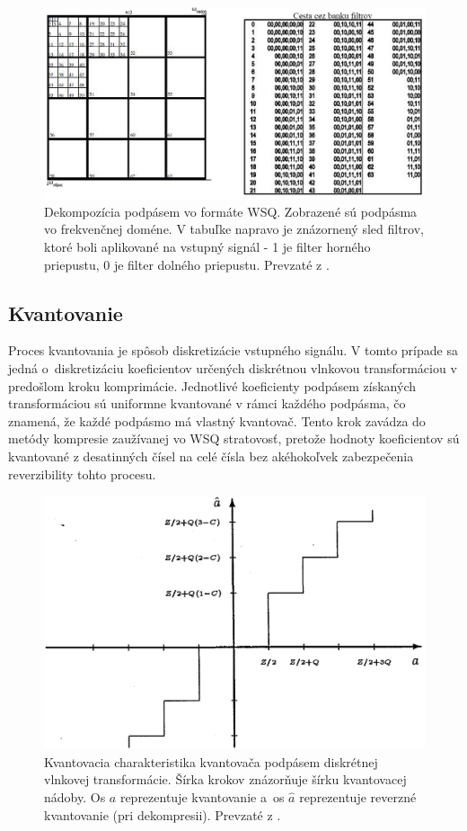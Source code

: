   \begin{figure}[h]
    \centering
    \includegraphics[width=\linewidth]{obrazky-figures/WSQ_DWT_subband_decomposition.png}
    \caption{Dekompozícia podpásem vo formáte WSQ. Zobrazené sú podpásma vo frekvenčnej doméne. V tabuľke napravo je znázornený sled filtrov, ktoré boli
    aplikované na vstupný signál - 1 je filter horného priepustu, 0 je filter dolného priepustu. Prevzaté z \cite{WSQSpecification}.}
    \label{obr:WSQ_DWT_dekompozicia}
  \end{figure}

  \subsection{Kvantovanie}
  Proces kvantovania je spôsob diskretizácie vstupného signálu. V tomto prípade sa jedná o~diskretizáciu koeficientov určených diskrétnou vlnkovou
  transformáciou v predošlom kroku komprimácie. Jednotlivé koeficienty podpásem získaných transformáciou sú uniformne kvantované v rámci každého podpásma,
  čo znamená, že každé podpásmo má vlastný kvantovač. Tento krok zavádza do metódy kompresie zaužívanej vo WSQ stratovosť, pretože hodnoty koeficientov
  sú kvantované z desatinných čísel na celé čísla bez akéhokoľvek zabezpečenia reverzibility tohto procesu.

  \begin{figure}[h]
    \centering
    \includegraphics[width=0.6\linewidth]{obrazky-figures/wsq_kvantovacia_charakteristika.png}
    \caption{Kvantovacia charakteristika kvantovača podpásem diskrétnej vlnkovej transformácie. Šírka krokov znázorňuje šírku kvantovacej nádoby.
    Os $a$ reprezentuje kvantovanie a~os $\hat{a}$ reprezentuje reverzné kvantovanie (pri dekompresii). Prevzaté z \cite{brislawn1996compression}.}
    \label{obr:wsq_kvantovacia_charakteristika}
  \end{figure}


